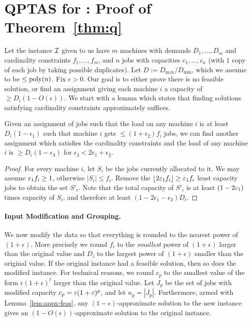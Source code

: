 \section{QPTAS for \cckp: Proof of Theorem~\ref{thm:q}}
\def\pv{\mathbf{b}}
\renewcommand{\dem}{\mathsf{cap}}
Let the instance ${\cal I}$ given to us have $m$ machines with demands $D_1,\ldots,D_m$ and cardinality constraints $f_1,\ldots,f_m$, and $n$ jobs with capacities
$c_1,\ldots,c_n$ (with $1$ copy of each job by taking possible duplicates). Let $D:= D_\mathrm{max}/D_\mathrm{min}$, which we assume to be $\leq \mathrm{poly}(n)$. 
Fix $\epsilon> 0$. Our goal is to either prove there is no feasible solution, or find an assignment 
giving each machine $i$ a capacity of $\geq D_i(1-O(\epsilon))$.
We start with a lemma which states that finding solutions satisfying cardinality constraints approximately suffices.
\begin{lemma}\label{lem:appx-feas}
	Given an assignment of jobs such that the load on any machine $i$  is at least $D_i(1 - \epsilon_1)$ such that machine $i$ gets $\leq (1+\epsilon_2)f_i$ jobs, 
	we can find another assignment which satisfies the cardinality constraints and the load of any machine $i$ is $\geq D_i(1 - \epsilon_3)$ for $\epsilon_3 < 2\epsilon_1+\epsilon_2$.
\end{lemma}
\begin{proof}
For every machine $i$, let $S_i$ be the jobs currently allocated to it. We may assume $\varepsilon_1 f_i \geq 1$, otherwise $|S_i| \leq f_i$.
Remove the $\lfloor2\varepsilon_1 f_i\rfloor \geq \varepsilon_1 f_i$ least capacity jobs to obtain the set $S'_i$. Note that the total capacity of $S'_i$ is at least $(1-2\varepsilon_1)$ times capacity of $S_i$, and therefore
at least $(1-2\epsilon_1 - \epsilon_2)D_i$. 
\end{proof}
\noindent
\paragraph{Input Modification and Grouping.}
We now modify the data so that everything is rounded to the nearest power of $(1+\epsilon)$. More precisely we round  $f_i$  to the {\em smallest} power of $(1+\epsilon)$ larger than the original value and $D_i$ to the largest power of $(1+\epsilon)$ smaller than the original value.
If the original instance had a feasible solution, then so does the modified instance. 
For technical reasons, we round $c_p$ to the smallest value of the form $\epsilon(1+\epsilon)^t$ larger than the original value.
Let $J_p$ be the set of jobs with modified capacity $c_p = \varepsilon (1+\varepsilon)^p$, and let $n_p = |J_p|$. Furthermore, armed with Lemma~\ref{lem:appx-feas}, any $(1-\epsilon)$-approximate solution to the new instance gives an $(1-O(\epsilon))$-approximate solution to the original instance.  \smallskip


